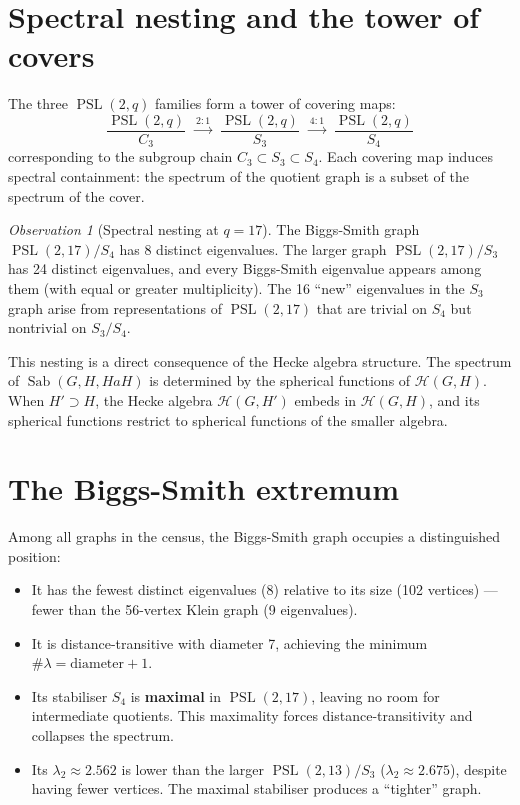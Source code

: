 \documentclass[11pt,a4paper]{article}
\theoremstyle{plain}
\theoremstyle{definition}
\theoremstyle{remark}
\newtheorem{observation}[theorem]{Observation}
\newcommand{\PSL}{\operatorname{PSL}}
\newcommand{\Sab}{\operatorname{Sab}}
\begin{document}
\section{Spectral nesting and the tower of covers}

The three $\PSL(2,q)$ families form a tower of covering maps:
\[
\frac{\PSL(2,q)}{C_3}
\;\xrightarrow{\ 2:1\ }\;
\frac{\PSL(2,q)}{S_3}
\;\xrightarrow{\ 4:1\ }\;
\frac{\PSL(2,q)}{S_4}
\]
corresponding to the subgroup chain $C_3 \subset S_3 \subset S_4$.
Each covering map induces spectral containment: the spectrum of the
quotient graph is a subset of the spectrum of the cover.

\begin{observation}[Spectral nesting at $q = 17$]
The Biggs-Smith graph $\PSL(2,17)/S_4$ has 8 distinct eigenvalues.
The larger graph $\PSL(2,17)/S_3$ has 24 distinct eigenvalues, and
every Biggs-Smith eigenvalue appears among them (with equal or greater
multiplicity). The 16 ``new'' eigenvalues in the $S_3$ graph arise from
representations of $\PSL(2,17)$ that are trivial on $S_4$ but nontrivial
on $S_3/S_4$.
\end{observation}

This nesting is a direct consequence of the Hecke algebra structure.
The spectrum of $\Sab(G, H, HaH)$ is determined by the spherical functions
of $\mathcal{H}(G, H)$. When $H' \supset H$, the Hecke algebra
$\mathcal{H}(G, H')$ embeds in $\mathcal{H}(G, H)$, and its spherical
functions restrict to spherical functions of the smaller algebra.


\section{The Biggs-Smith extremum}

Among all graphs in the census, the Biggs-Smith graph occupies a
distinguished position:

\begin{itemize}
\item It has the fewest distinct eigenvalues (8) relative to its size
  (102 vertices) --- fewer than the 56-vertex Klein graph (9 eigenvalues).
\item It is distance-transitive with diameter 7, achieving the minimum
  $\#\lambda = \text{diameter} + 1$.
\item Its stabiliser $S_4$ is \textbf{maximal} in $\PSL(2,17)$, leaving
  no room for intermediate quotients. This maximality forces
  distance-transitivity and collapses the spectrum.
\item Its $\lambda_2 \approx 2.562$ is lower than the larger
  $\PSL(2,13)/S_3$ ($\lambda_2 \approx 2.675$), despite having fewer
  vertices. The maximal stabiliser produces a ``tighter'' graph.
\end{itemize}
\end{document}
